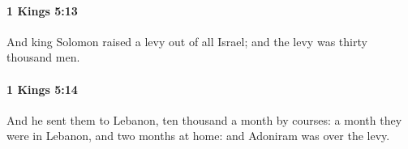 		\paragraph{1 Kings 5:13} %
			\label{1KINGS-5-13}

			And king Solomon raised a levy out of all Israel; and the levy was thirty thousand men.


		\paragraph{1 Kings 5:14} %
			\label{1KINGS-5-14}

			And he sent them to Lebanon, ten thousand a month by courses: a month they were in Lebanon, and two months at home: and Adoniram was over the levy.



